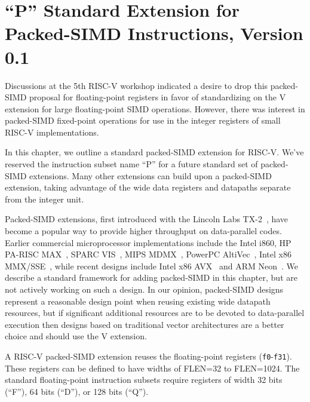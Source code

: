 \chapter{``P'' Standard Extension for Packed-SIMD Instructions,
  Version 0.1}
\label{sec:packedsimd}

\begin{commentary}
  Discussions at the 5th RISC-V workshop indicated a desire to drop
  this packed-SIMD proposal for floating-point registers in favor of
  standardizing on the V extension for large floating-point SIMD
  operations.  However, there was interest in packed-SIMD fixed-point
  operations for use in the integer registers of small RISC-V
  implementations.
\end{commentary}

In this chapter, we outline a standard packed-SIMD extension for
RISC-V.  We've reserved the instruction subset name ``P'' for a future
standard set of packed-SIMD extensions.  Many other extensions can
build upon a packed-SIMD extension, taking advantage of the wide data
registers and datapaths separate from the integer unit.

\begin{commentary}
Packed-SIMD extensions, first introduced with the Lincoln Labs TX-2~\cite{tx2},
have become a popular way to provide higher throughput on data-parallel
codes. Earlier commercial microprocessor implementations include the
Intel i860, HP PA-RISC MAX~\cite{lee-max-ieeemicro1996}, SPARC
VIS~\cite{tremblay-vis-ieeemicro1996}, MIPS
MDMX~\cite{gwennap-mdmx-mpr1996}, PowerPC
AltiVec~\cite{diefendorff-altivec-ieeemicro2000}, Intel x86
MMX/SSE~\cite{peleg-mmx-ieeemicro1996, raman-sse-ieeemicro2000}, while
recent designs include Intel x86 AVX~\cite{lomont-avx-irm2011} and ARM
Neon~\cite{goodacre-armisa-computer2005}.  We describe a standard
framework for adding packed-SIMD in this chapter, but are not actively
working on such a design.  In our opinion, packed-SIMD designs represent
a reasonable design point when reusing existing wide datapath resources,
but if significant additional resources are to be devoted to
data-parallel execution then designs based on traditional vector
architectures are a better choice and should use the V extension.

\end{commentary}

A RISC-V packed-SIMD extension reuses the floating-point registers
({\tt f0}-{\tt f31}).  These registers can be defined to have widths
of FLEN=32 to FLEN=1024.  The standard floating-point instruction
subsets require registers of width 32 bits (``F''), 64 bits (``D''),
or 128 bits (``Q'').


